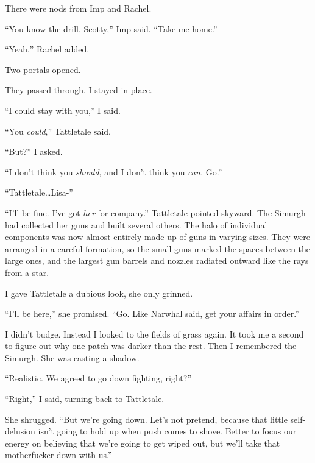 There were nods from Imp and Rachel.



``You know the drill, Scotty,'' Imp said.  ``Take me home.''



``Yeah,'' Rachel added.



Two portals opened.



They passed through.  I stayed in place.



``I could stay with you,'' I said.



``You \emph{could},'' Tattletale said.



``But?'' I asked.



``I don't think you \emph{should}, and I don't think you \emph{can. } Go.''



``Tattletale\ldots Lisa-''



``I'll be fine.  I've got \emph{her} for company.''  Tattletale pointed skyward.  The Simurgh had collected her guns and built several others.  The halo of individual components was now almost entirely made up of guns in varying sizes.  They were arranged in a careful formation, so the small guns marked the spaces between the large ones, and the largest gun barrels and nozzles radiated outward like the rays from a star.



I gave Tattletale a dubious look, she only grinned.



``I'll be here,'' she promised.  ``Go.  Like Narwhal said, get your affairs in order.''



I didn't budge.  Instead I looked to the fields of grass again.  It took me a second to figure out why one patch was darker than the rest.  Then I remembered the Simurgh.  She was casting a shadow.



``Realistic.  We agreed to go down fighting, right?''



``Right,'' I said, turning back to Tattletale.



She shrugged.  ``But we're going down.  Let's not pretend, because that little self-delusion isn't going to hold up when push comes to shove.  Better to focus our energy on believing that we're going to get wiped out, but we'll take that motherfucker down with us.''



